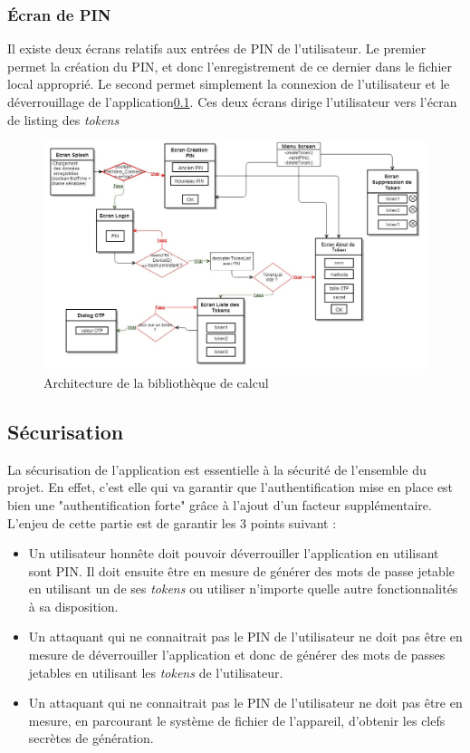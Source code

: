 \subsubsection{Écran de PIN}
Il existe deux écrans relatifs aux entrées de PIN de l'utilisateur. Le premier permet la création
du PIN, et donc l'enregistrement de ce dernier dans le fichier local approprié. Le second permet
simplement la connexion de l'utilisateur et le déverrouillage de l'application\ref{secu}. Ces deux
écrans dirige l'utilisateur vers l'écran de listing des \emph{tokens}


\begin{figure}
  \centering
  \includegraphics[scale=0.4]{../graphics/archi-android.jpg}
  \caption{Architecture de la bibliothèque de calcul}
  \label{fig:umlLib}
\end{figure}

\subsection{Sécurisation}
\label{secu}
La sécurisation de l'application est essentielle à la sécurité de l'ensemble du projet. En
effet, c'est elle qui va garantir que l'authentification mise en place est bien une
"authentification forte" grâce à l'ajout d'un facteur supplémentaire. L'enjeu de cette 
partie est de garantir les 3 points suivant : 


\begin{itemize}
  \item[1 -] Un utilisateur honnête doit pouvoir déverrouiller l'application en utilisant 
  sont PIN. Il doit ensuite être en mesure de générer des mots de passe jetable en utilisant
  un de ses \emph{tokens} ou utiliser n'importe quelle autre fonctionnalités à sa
  disposition.
  \item[2 -] Un attaquant qui ne connaitrait pas le PIN de l'utilisateur ne doit pas être en
  mesure de déverrouiller l'application et donc de générer des mots de passes jetables en
  utilisant les \emph{tokens} de l'utilisateur.
  \item[3 -] Un attaquant qui ne connaitrait pas le PIN de l'utilisateur ne doit pas être en
  mesure, en parcourant le système de fichier de l'appareil, d'obtenir les clefs secrètes
  de génération.
\end{itemize}

